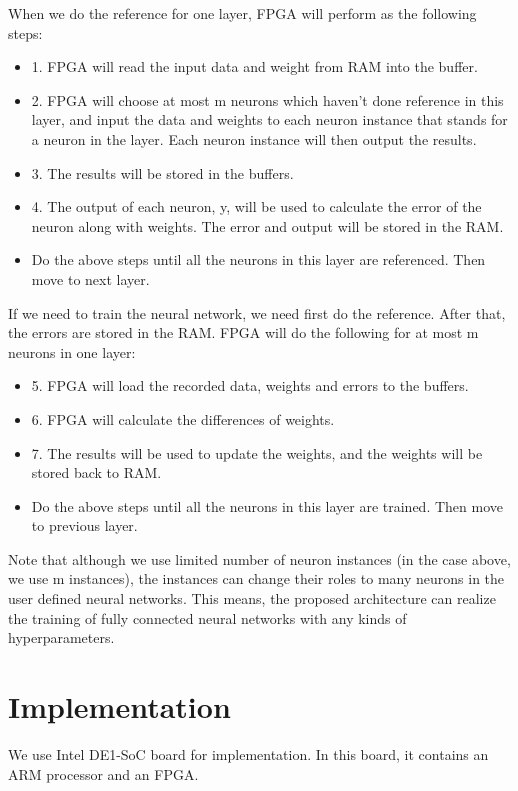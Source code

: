 \documentclass[conference]{IEEEtran}
\begin{document}
When we do the reference for one layer, FPGA will perform as the following steps:
\begin{itemize}
\item 1. FPGA will read the input data and weight from RAM into the buffer.
\item 2. FPGA will choose at most m neurons which haven't done reference in this layer, and input the data and weights to each neuron instance that stands for a neuron in the layer. Each neuron instance will then output the results.
\item 3. The results will be stored in the buffers.
\item 4. The output of each neuron, y, will be used to calculate the error of the neuron along with weights. The error and output will be stored in the RAM.
\item Do the above steps until all the neurons in this layer are referenced. Then move to next layer.
\end{itemize}

If we need to train the neural network, we need first do the reference. After that, the errors are stored in the RAM. FPGA will do the following for at most m neurons in one layer:
\begin{itemize}
\item 5. FPGA will load the recorded data, weights and errors to the buffers.
\item 6. FPGA will calculate the differences of weights. 
\item 7. The results will be used to update the weights, and the weights will be stored back to RAM.
\item Do the above steps until all the neurons in this layer are trained. Then move to previous layer.
\end{itemize}

Note that although we use limited number of neuron instances (in the case above, we use m instances), the instances can change their roles to many neurons in the user defined neural networks. This means, the proposed architecture can realize the training of fully connected neural networks with any kinds of hyperparameters.

\section{Implementation}
\label{sec:impl}

We use Intel DE1-SoC board for implementation. In this board, it contains an ARM processor and an FPGA. 
\end{document}
